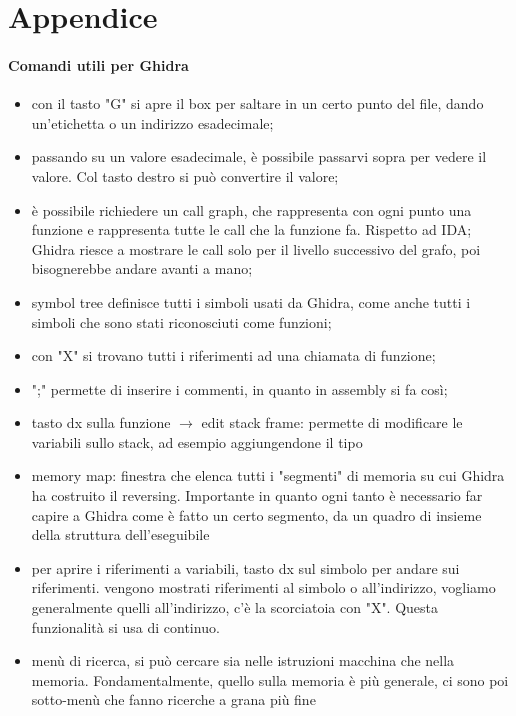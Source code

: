\documentclass[12pt, oneside]{extbook}
\begin{document}
\newpage
\chapter*{Appendice}
\subsubsection*{Comandi utili per Ghidra}
\begin{itemize}
\item con il tasto "G" si apre il box per saltare in un certo punto del file, dando un'etichetta o un indirizzo esadecimale;
\item passando su un valore esadecimale, è possibile passarvi sopra per vedere il valore. Col tasto destro si può convertire il valore;
\item è possibile richiedere un call graph, che rappresenta con ogni punto una funzione e rappresenta tutte le call che la funzione fa. Rispetto ad IDA; Ghidra riesce a mostrare le call solo per il livello successivo del grafo, poi bisognerebbe andare avanti a mano;
\item symbol tree definisce tutti i simboli usati da Ghidra, come anche tutti i simboli che sono stati riconosciuti come funzioni;
\item con "X" si trovano tutti i riferimenti ad una chiamata di funzione;
\item ";" permette di inserire i commenti, in quanto in assembly si fa così;
\item tasto dx sulla funzione $\rightarrow$ edit stack frame: permette di modificare le variabili sullo stack, ad esempio aggiungendone il tipo
\item memory map: finestra che elenca tutti i "segmenti" di memoria su cui Ghidra ha costruito il reversing. Importante in quanto ogni tanto è necessario far capire a Ghidra come è fatto un certo segmento, da un quadro di insieme della struttura dell'eseguibile
\item per aprire i riferimenti a variabili, tasto dx sul simbolo per andare sui riferimenti. vengono mostrati riferimenti al simbolo o all'indirizzo, vogliamo generalmente quelli all'indirizzo, c'è la scorciatoia con "X". Questa funzionalità si usa di continuo.
\item menù di ricerca, si può cercare sia nelle istruzioni macchina che nella memoria. Fondamentalmente, quello sulla memoria è più generale, ci sono poi sotto-menù che fanno ricerche a grana più fine
\end{itemize}
\end{document}
